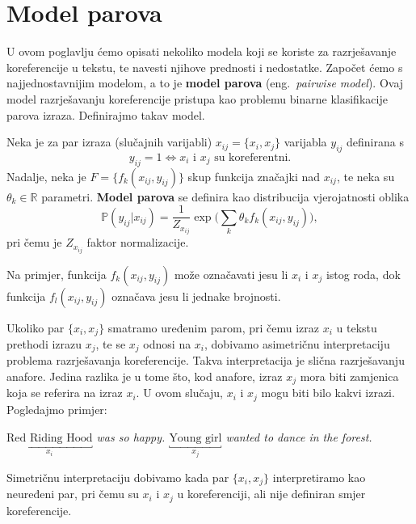 \documentclass[a4paper,twoside,12pt]{memoir} %
\newcommand{\ti}[1]{\textit{#1\/}}
\newcommand{\tb}{\textbf}
\begin{document}
	\section{Model parova}

	U ovom poglavlju ćemo opisati nekoliko modela koji se koriste za razrješavanje koreferencije u tekstu, te navesti njihove prednosti i nedostatke. Započet ćemo s najjednostavnijim modelom, a to je \tb{model parova} (eng.~\ti{pairwise model}). Ovaj model razrješavanju koreferencije pristupa kao problemu binarne klasifikacije parova izraza. Definirajmo takav model.

	\begin{defn}
		Neka je za par izraza (slučajnih varijabli) $x_{ij} = \{x_i, x_j\}$ varijabla $y_{ij}$ definirana s
		\begin{equation*}
		y_{ij} = 1 \iff x_i \text{ i } x_j \text{ su koreferentni}.
		\end{equation*}
		Nadalje, neka je $F = \{f_k(x_{ij}, y_{ij})\}$ skup funkcija značajki nad $x_{ij}$, te neka su $\theta_k \in \mathbb{R}$ parametri. \tb{Model parova} se definira kao distribucija vjerojatnosti oblika
		\begin{equation}\label{pairwise}
		\mathbb{P} (y_{ij} | x_{ij}) =
		\frac {1}{Z_{x_{ij}}} \exp\bigg(\sum\limits_{k} \theta_k f_k(x_{ij}, y_{ij})\bigg),
		\end{equation}
		pri čemu je $Z_{x_{ij}}$ faktor normalizacije.
	\end{defn}

	Na primjer, funkcija $f_k(x_{ij}, y_{ij})$ može označavati jesu li $x_i$ i $x_j$ istog roda, dok funkcija $f_l(x_{ij}, y_{ij})$ označava jesu li jednake brojnosti.

	Ukoliko par $\{x_i, x_j\}$ smatramo uređenim parom, pri čemu izraz $x_i$ u tekstu prethodi izrazu $x_j$, te se $x_j$ odnosi na $x_i$, dobivamo asimetričnu interpretaciju problema razrješavanja koreferencije. Takva interpretacija je slična razrješavanju anafore. Jedina razlika je u tome što, kod anafore, izraz $x_j$ mora biti zamjenica koja se referira na izraz $x_i$. U ovom slučaju, $x_i$ i $x_j$ mogu biti bilo kakvi izrazi. Pogledajmo primjer:

	\bigskip

	\ti{$\underbracket{\text{Red Riding Hood}}_{x_{i}}$ was so happy. $\underbracket{\text{Young girl}}_{x_j}$ wanted to dance in the forest.}

	\bigskip

	Simetričnu interpretaciju dobivamo kada par $\{x_i, x_j\}$ interpretiramo kao ne\-ure\-đe\-ni par, pri čemu su $x_i$ i $x_j$ u koreferenciji, ali nije definiran smjer koreferencije.
\end{document}
